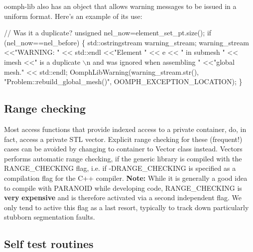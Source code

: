 \begin{DoxyItemize}
\item {\ttfamily oomph-\/lib} also has an object that allows warning messages to be issued in a uniform format. Here's an example of its use\-: 
\begin{DoxyCode}
\textcolor{comment}{// Was it a duplicate?}
\textcolor{keywordtype}{unsigned} nel\_now=element\_set\_pt.size();
\textcolor{keywordflow}{if} (nel\_now==nel\_before)
 \{
  std::ostringstream warning\_stream;
  warning\_stream  <<\textcolor{stringliteral}{"WARNING: "} << std::endl
                  <<\textcolor{stringliteral}{"Element "} << e << \textcolor{stringliteral}{" in submesh "} << imesh 
                  <<\textcolor{stringliteral}{" is a duplicate \(\backslash\)n and was ignored when assembling "} 
                  <<\textcolor{stringliteral}{"global mesh."} << std::endl;
  OomphLibWarning(warning\_stream.str(),
                  \textcolor{stringliteral}{"Problem::rebuild\_global\_mesh()"},
                  OOMPH\_EXCEPTION\_LOCATION);
 \}
\end{DoxyCode}

\end{DoxyItemize}\hypertarget{index_range}{}\subsection{Range checking}\label{index_range}

\begin{DoxyItemize}
\item Most access functions that provide indexed access to a private container, do, in fact, access a private S\-T\-L vector. Explicit range checking for these (frequent!) cases can be avoided by changing to container to Vector class instead. Vectors performs automatic range checking, if the {\ttfamily generic} library is compiled with the {\ttfamily R\-A\-N\-G\-E\-\_\-\-C\-H\-E\-C\-K\-I\-N\-G} flag, i.\-e. if {\ttfamily -\/\-D\-R\-A\-N\-G\-E\-\_\-\-C\-H\-E\-C\-K\-I\-N\-G} is specified as a compilation flag for the C++ compiler. {\bfseries Note\-:} While it is generally a good idea to compile with {\ttfamily P\-A\-R\-A\-N\-O\-I\-D} while developing code, {\ttfamily R\-A\-N\-G\-E\-\_\-\-C\-H\-E\-C\-K\-I\-N\-G} is {\bfseries very} {\bfseries expensive} and is therefore activated via a second independent flag. We only tend to active this flag as a last resort, typically to track down particularly stubborn segmentation faults.
\end{DoxyItemize}\hypertarget{index_self_test}{}\subsection{Self test routines}\label{index_self_test}

